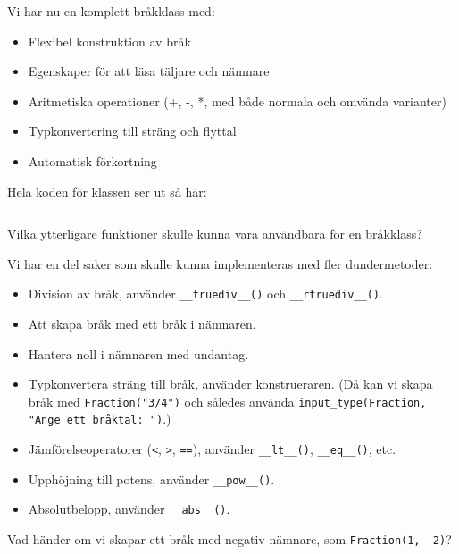 Vi har nu en komplett bråkklass med:
\begin{itemize}
  \item Flexibel konstruktion av bråk
  \item Egenskaper för att läsa täljare och nämnare
  \item Aritmetiska operationer (+, -, *, med både normala och omvända varianter)
  \item Typkonvertering till sträng och flyttal
  \item Automatisk förkortning
\end{itemize}

Hela koden för klassen ser ut så här:
\begin{frame}[fragile]
  \inputminted[linenos]{python}{examples/myfrac_simplify.py}
\end{frame}

\begin{exercise}
  Vilka ytterligare funktioner skulle kunna vara användbara för en bråkklass?
\end{exercise}

Vi har en del saker som skulle kunna implementeras med fler dundermetoder:
\begin{itemize}
  \item Division av bråk, använder \texttt{__truediv__()} och 
  \texttt{__rtruediv__()}.
  \item Att skapa bråk med ett bråk i nämnaren.
  \item Hantera noll i nämnaren med undantag.
  \item Typkonvertera sträng till bråk, använder konstrueraren.
    (Då kan vi skapa bråk med \texttt{Fraction("3/4")} och således 
    använda \texttt{input_type(Fraction, "Ange ett bråktal: ")}.)
  \item Jämförelseoperatorer (\texttt{<}, \texttt{>}, 
    \texttt{==}), använder \texttt{__lt__()}, 
    \texttt{__eq__()}, etc.
  \item Upphöjning till potens, använder \texttt{__pow__()}.
  \item Absolutbelopp, använder \texttt{__abs__()}.
\end{itemize}

\begin{exercise}
  Vad händer om vi skapar ett bråk med negativ nämnare, som 
  \texttt{Fraction(1, -2)}?
\end{exercise}

